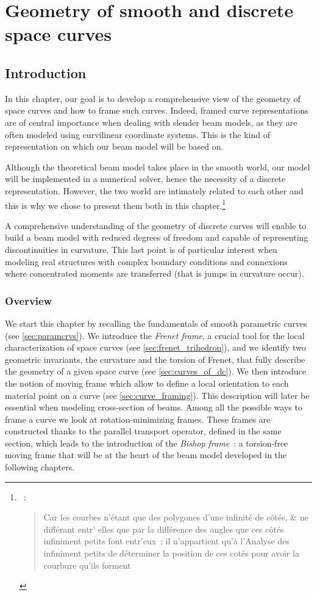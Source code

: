 \chapter{Geometry of smooth and discrete space curves}
\section{Introduction}
In this chapter, our goal is to develop a comprehensive view of the geometry of space curves and how to frame such curves. Indeed, framed curve representations are of central importance when dealing with slender beam models, as they are often modeled using curvilinear coordinate systems. This is the kind of representation on which our beam model will be based on.

Although the theoretical beam model takes place in the smooth world, our model will be implemented in a numerical solver, hence the necessity of a discrete representation. However, the two world are intimately related to each other and this is why we chose to present them both in this chapter.\footnote{~: \blockquote{Car les courbes n’étant que des polygones d’une infinité de côtés, \& ne différant
entr' elles que par la différence des angles que ces côtés infiniment petits font
entr'eux~; il n’appartient qu’à l’Analyse des infiniment petits de déterminer la
position de ces cotés pour avoir la courbure qu’ils forment \belp{}}.}

A comprehensive understanding of the geometry of discrete curves will enable to build a beam model with reduced degrees of freedom and capable of representing discontinuities in curvature. This last point is of particular interest when modeling real structures with complex boundary conditions and connexions where concentrated moments are transferred (that is jumps in curvature occur).

\subsection{Overview}
We start this chapter by recalling the fundamentals of smooth parametric curves (see \cref{sec:paramcrvs}). We introduce the \emph{Frenet frame}, a crucial tool for the local characterization of space curves (see \cref{sec:frenet_trihedron}), and we identify two geometric invariants, the curvature and the torsion of Frenet, that fully describe the geometry of a given space curve (see \cref{sec:curves_of_dc}). We then introduce the notion of moving frame which allow to define a local orientation to each material point on a curve (see \cref{sec:curve_framing}). This description will later be essential when modeling cross-section of beams. Among all the possible ways to frame a curve we look at rotation-minimizing frames. These frames are constructed thanks to the parallel transport operator, defined in the same section, which leads to the introduction of the \emph{Bishop frame}~: a torsion-free moving frame that will be at the heart of the beam model developed in the following chapters.

